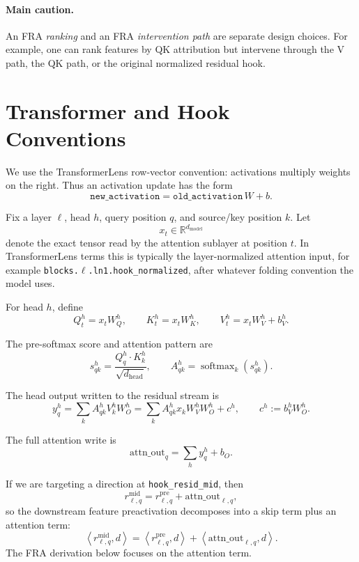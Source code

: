 \documentclass[11pt]{article}
\newcommand{\R}{\mathbb{R}}
\newcommand{\ip}[2]{\left\langle #1, #2 \right\rangle}
\newcommand{\softmax}{\operatorname{softmax}}
\newcommand{\dm}{d_{\mathrm{model}}}
\newcommand{\dhead}{d_{\mathrm{head}}}
\newcommand{\pretag}{\mathrm{pre}}
\newcommand{\midtag}{\mathrm{mid}}
\newcommand{\hook}[1]{\texttt{#1}}
\newcommand{\residpre}{r^{\pretag}}
\newcommand{\residmid}{r^{\midtag}}
\newcommand{\attnout}{\mathrm{attn\_out}}
\theoremstyle{definition}
\theoremstyle{plain}
\theoremstyle{remark}
\begin{document}
\paragraph{Main caution.}
An FRA \emph{ranking} and an FRA \emph{intervention path} are separate design
choices.  For example, one can rank features by QK attribution but intervene
through the V path, the QK path, or the original normalized residual hook.

\section{Transformer and Hook Conventions}

We use the TransformerLens row-vector convention: activations multiply weights
on the right.  Thus an activation update has the form
\[
  \texttt{new\_activation} = \texttt{old\_activation}\, W + b.
\]

Fix a layer \(\ell\), head \(h\), query position \(q\), and source/key
position \(k\).  Let
\[
  x_t \in \R^{\dm}
\]
denote the exact tensor read by the attention sublayer at position \(t\).  In
TransformerLens terms this is typically the layer-normalized attention input,
for example \hook{blocks.\(\ell\).ln1.hook\_normalized}, after whatever
folding convention the model uses.

For head \(h\), define
\[
  Q_t^h = x_t W_Q^h,\qquad
  K_t^h = x_t W_K^h,\qquad
  V_t^h = x_t W_V^h + b_V^h.
\]

The pre-softmax score and attention pattern are
\[
  s_{qk}^h =
  \frac{Q_q^h \cdot K_k^h}{\sqrt{\dhead}},
  \qquad
  A_{qk}^h = \softmax_k(s_{qk}^h).
\]

The head output written to the residual stream is
\[
  y_q^h
  =
  \sum_k A_{qk}^h V_k^h W_O^h
  =
  \sum_k A_{qk}^h x_k W_V^h W_O^h + c^h,
  \qquad
  c^h := b_V^h W_O^h.
\]

The full attention write is
\[
  \attnout_q = \sum_h y_q^h + b_O.
\]

If we are targeting a direction at \hook{hook\_resid\_mid}, then
\[
  \residmid_{\ell,q}
  =
  \residpre_{\ell,q}
  +
  \attnout_{\ell,q},
\]
so the downstream feature preactivation decomposes into a skip term plus an
attention term:
\[
  \ip{\residmid_{\ell,q}}{d}
  =
  \ip{\residpre_{\ell,q}}{d}
  +
  \ip{\attnout_{\ell,q}}{d}.
\]
The FRA derivation below focuses on the attention term.
\end{document}
